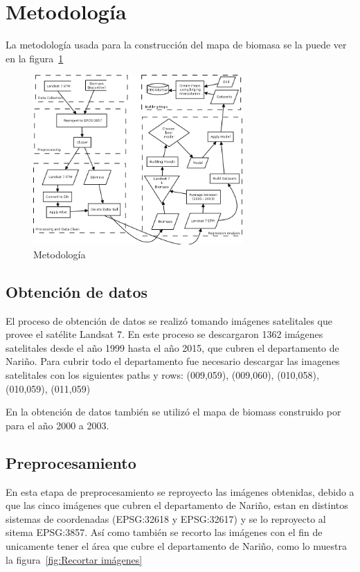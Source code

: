 
\section{Metodología}

La metodología usada para la construcción del mapa de biomasa se la puede ver en la figura~\ref{fig:metodology}

\begin{figure}
  \centering
  \includegraphics[width = 8cm]{metodology.png}
  \caption{Metodología}
  \label{fig:metodology}
\end{figure}

\subsection{Obtención de datos}

El proceso de obtención de datos se realizó tomando imágenes satelitales que provee el satélite
Landsat 7. En este proceso se descargaron 1362 imágenes satelitales desde el año 1999 hasta el año 2015, que cubren el 
departamento de Nariño. Para cubrir todo el departamento fue necesario descargar las imagenes satelitales con 
los siguientes paths y rows: (009,059), (009,060), (010,058), (010,059), (011,059) 

En la obtención de datos también se utilizó el mapa de biomass construido por \cite{baccini2008afirst} 
para el año 2000 a 2003.

\subsection{Preprocesamiento}

En esta etapa de preprocesamiento se reproyecto las imágenes obtenidas, debido a que las cinco imágenes
que cubren el departamento de Nariño, estan en distintos sistemas de coordenadas (EPSG:32618 y EPSG:32617) y se 
lo reproyecto al sitema EPSG:3857. Así como también se recorto las imágenes con el fin de unicamente tener 
el área que cubre el departamento de Nariño, como lo muestra la figura~\ref{fig:Recortar imágenes}

